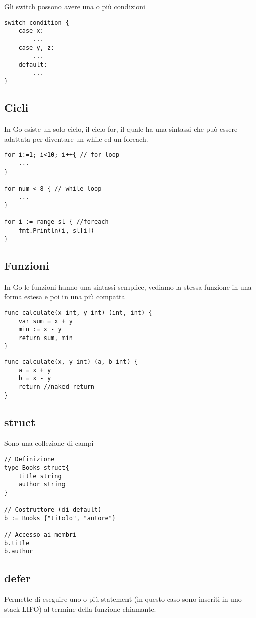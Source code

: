 Gli switch possono avere una o più condizioni
\begin{verbatim} 
switch condition {
	case x:
		...
	case y, z:
		...
	default:
		...
}
\end{verbatim}

\subsection{Cicli}
In Go esiste un solo ciclo, il ciclo for, il quale ha una sintassi che può essere adattata per diventare un while ed un foreach.
\begin{verbatim}
for i:=1; i<10; i++{ // for loop
    ...
}

for num < 8 { // while loop
    ...
}

for i := range sl { //foreach
    fmt.Println(i, sl[i])
}
\end{verbatim}

\subsection{Funzioni}
In Go le funzioni hanno una sintassi semplice, vediamo la stessa funzione in una forma estesa e poi in una più compatta

\begin{verbatim}
func calculate(x int, y int) (int, int) {
    var sum = x + y
    min := x - y
    return sum, min
}
\end{verbatim}

\begin{verbatim}
func calculate(x, y int) (a, b int) {
    a = x + y
    b = x - y
    return //naked return
}
\end{verbatim}

\subsection{struct}
Sono una collezione di campi

\begin{verbatim}
// Definizione
type Books struct{
    title string
    author string
}

// Costruttore (di default)
b := Books {"titolo", "autore"}

// Accesso ai membri
b.title
b.author
\end{verbatim}

\subsection{defer}
Permette di eseguire uno o più statement (in questo caso sono inseriti in uno stack LIFO) al termine della funzione chiamante.

